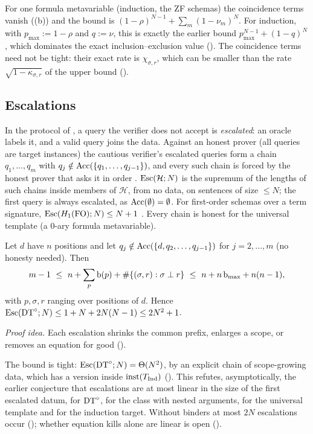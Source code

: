 For one formula metavariable (induction, the ZF schemas) the coincidence terms vanish ((b)) and the bound is $(1-\rho)^{N-1}+\sum_m(1-\nu_m)^N$. For induction, with $p_{\max}:=1-\rho$ and $q:=\nu$, this is exactly the earlier bound $p_{\max}^{N-1}+(1-q)^N$ , which dominates the exact inclusion--exclusion value (). The coincidence terms need not be tight: their exact rate is $\chi_{\sigma,r}$, which can be smaller than the rate $\sqrt{1-\kappa_{\sigma,r}}$ of the upper bound ().

\subsection{Escalations}\label{sec:single:esc}

In the protocol of , a query the verifier does not accept is \emph{escalated}: an oracle labels it, and a valid query joins the data. Against an honest prover (all queries are target instances) the cautious verifier's escalated queries form a chain $q_1,\dots,q_m$ with $q_j\notin\mathrm{Acc}(\{q_1,\dots,q_{j-1}\})$, and every such chain is forced by the honest prover that asks it in order \citep{claude2026whatfollows}. $\mathrm{Esc}(\mathcal H;N)$ is the supremum of the lengths of such chains inside members of $\mathcal H$, from no data, on sentences of size $\le N$; the first query is always escalated, as $\mathrm{Acc}(\emptyset)=\emptyset$. For first-order schemas over a term signature, $\mathrm{Esc}(H_{1}(\mathrm{FO});N)\le N+1$ \citep{claude2026whatfollows}. Every chain is honest for the universal template (a $0$-ary formula metavariable).

\begin{theorem}\label{thm:single:esc}
Let $d$ have $n$ positions and let $q_j\notin\mathrm{Acc}(\{d,q_2,\dots,q_{j-1}\})$ for $j=2,\dots,m$ (no honesty needed). Then
\[
m-1\ \le\ n+\sum_{p}\singlebd(p)+\#\{(\sigma,r):\sigma\perp r\}\ \le\ n+n\,\singlebd_{\max}+n(n-1),
\]
with $p,\sigma,r$ ranging over positions of $d$. Hence $\mathrm{Esc}(\mathrm{DT}^{\circ};N)\le1+N+2N(N-1)\le2N^2+1$.
\end{theorem}

\noindent\emph{Proof idea.} Each escalation shrinks the common prefix, enlarges a scope, or removes an equation for good ().

The bound is tight: $\mathrm{Esc}(\mathrm{DT}^{\circ};N)=\Theta(N^2)$, by an explicit chain of scope-growing data, which has a version inside $\mathrm{inst}(T_{\mathrm{Ind}})$ (). This refutes, asymptotically, the earlier conjecture that escalations are at most linear in the size of the first escalated datum, for $\mathrm{DT}^{\circ}$, for the class with nested arguments, for the universal template and for the induction target. Without binders at most $2N$ escalations occur (); whether equation kills alone are linear is open ().

